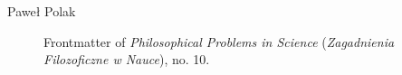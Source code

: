 \begin{artengenv}{Paweł Polak}
\begin{figure}[htp]
	\centering
	\caption{Frontmatter of %
		\textit{Philosophical Problems in Science} (\textit{Zagadnienia Filozoficzne w Nauce}), no. 10.}
	\label{polak-fig1}
\end{figure}


\end{artengenv}
